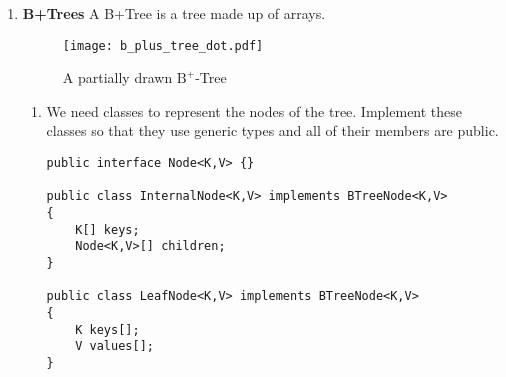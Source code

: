 \documentclass[11pt]{article}
\newenvironment{answer}{\large\lstset{basicstyle=\large}\color{white}}{}
\newenvironment{answer}{\large\lstset{basicstyle=\large}\color{red}}{}
\begin{document}
\begin{enumerate}
\item{\bf B+Trees} A B+Tree is a tree made up of arrays.

\begin{figure}
\caption{A partially drawn $\textrm{B}^+$-Tree}
\texttt{[image: b\_plus\_tree\_dot.pdf]}
\end{figure}

    \begin{enumerate}
    \item We need classes to represent the nodes of the tree. Implement these
    classes so that they use generic types and all of their members are public.

\begin{answer}
\begin{lstlisting}
public interface Node<K,V> {}

public class InternalNode<K,V> implements BTreeNode<K,V>
{
    K[] keys;
    Node<K,V>[] children;
}

public class LeafNode<K,V> implements BTreeNode<K,V>
{
    K keys[];
    V values[];
}
\end{lstlisting}
\end{answer}

    \end{enumerate}

\end{enumerate}
\end{document}

